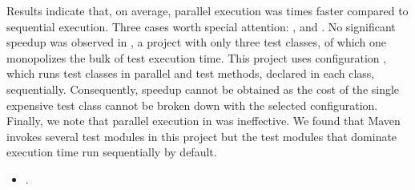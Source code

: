 Results indicate that, on average, parallel execution was
\avgSpeedup{} times faster compared to sequential execution.  Three
cases worth special attention: ,  and
.  No significant speedup was observed in
, a project with only three test classes, of which one
monopolizes the bulk of test execution time.  This project uses
configuration \ParClassSeqMeth{}, which runs test classes in parallel
and test methods, declared in each class, sequentially.  Consequently,
speedup cannot be obtained as the cost of the single expensive test
class cannot be broken down with the selected configuration.  Finally, we note that parallel
execution in  was ineffective.  We found that Maven
invokes several test modules in this project but the test modules that
dominate execution time run sequentially by default.


\begin{center}
\end{center}

\begin{itemize}
    \item \numRQSpeedupTwo{}. \textbf{\RQSpeedupTwo}
\end{itemize}

\newcommand{\subjectScalability}{MapDB}

